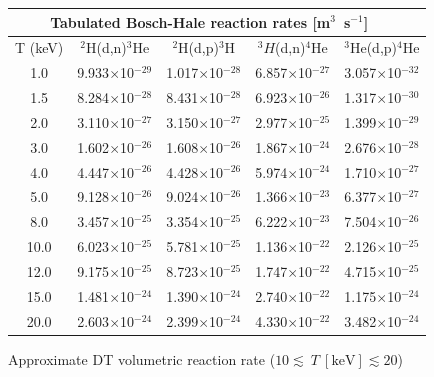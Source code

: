 {
\noindent
\begin{table}[h!]\small
  \noindent
  \centering
  \begin{tabular}{c c c c c}
    \multicolumn{5}{c}{Tabulated Bosch-Hale reaction rates [m$^3$~s$^{-1}$]~~\cite{bosch}}\\
    \hline
    T (keV) \T\B& $^2$H(d,n)$^3$He & $^2$H(d,p)$^3$H & $^3H$(d,n)$^4$He & $^3$He(d,p)$^4$He\\
    \hline\hline
    1.0\T& 9.933$\times$10$^{-29}$ & 1.017$\times$10$^{-28}$ & 6.857$\times$10$^{-27}$ & 3.057$\times$10$^{-32}$ \\
    1.5  & 8.284$\times$10$^{-28}$ & 8.431$\times$10$^{-28}$ & 6.923$\times$10$^{-26}$ & 1.317$\times$10$^{-30}$ \\
    2.0  & 3.110$\times$10$^{-27}$ & 3.150$\times$10$^{-27}$ & 2.977$\times$10$^{-25}$ & 1.399$\times$10$^{-29}$ \\
    3.0  & 1.602$\times$10$^{-26}$ & 1.608$\times$10$^{-26}$ & 1.867$\times$10$^{-24}$ & 2.676$\times$10$^{-28}$ \\
    4.0  & 4.447$\times$10$^{-26}$ & 4.428$\times$10$^{-26}$ & 5.974$\times$10$^{-24}$ & 1.710$\times$10$^{-27}$ \\
    5.0  & 9.128$\times$10$^{-26}$ & 9.024$\times$10$^{-26}$ & 1.366$\times$10$^{-23}$ & 6.377$\times$10$^{-27}$ \\
    8.0  & 3.457$\times$10$^{-25}$ & 3.354$\times$10$^{-25}$ & 6.222$\times$10$^{-23}$ & 7.504$\times$10$^{-26}$ \\
   10.0  & 6.023$\times$10$^{-25}$ & 5.781$\times$10$^{-25}$ & 1.136$\times$10$^{-22}$ & 2.126$\times$10$^{-25}$ \\
   12.0  & 9.175$\times$10$^{-25}$ & 8.723$\times$10$^{-25}$ & 1.747$\times$10$^{-22}$ & 4.715$\times$10$^{-25}$ \\
   15.0  & 1.481$\times$10$^{-24}$ & 1.390$\times$10$^{-24}$ & 2.740$\times$10$^{-22}$ & 1.175$\times$10$^{-24}$ \\
   20.0\B& 2.603$\times$10$^{-24}$ & 2.399$\times$10$^{-24}$ & 4.330$\times$10$^{-22}$ & 3.482$\times$10$^{-24}$ \\
   \hline
  \end{tabular}
  \label{table:rr}
\end{table}

\noindent
Approximate DT volumetric reaction rate ($10\lesssim~T~\mathrm{[keV]}\lesssim20$) 

}
